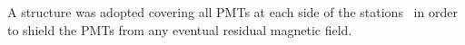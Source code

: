 

A structure was adopted covering all PMTs at each side of the stations~\cite{2010NIMPA.615...14B} in order to shield the PMTs from any eventual residual magnetic field.


